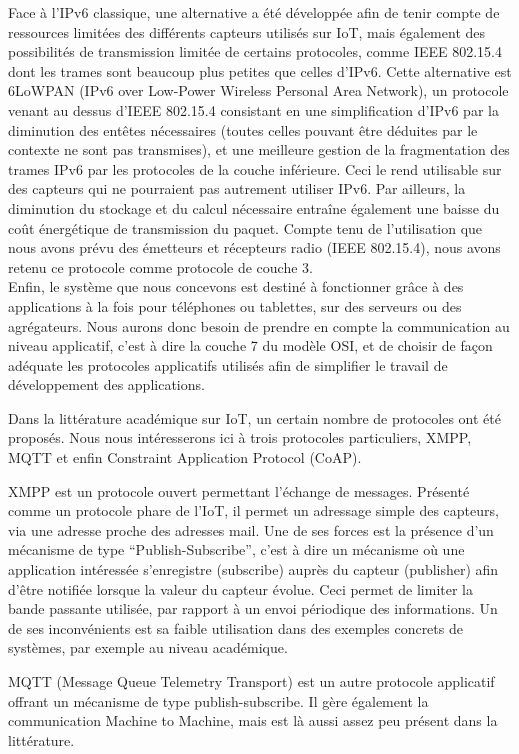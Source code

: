 \documentclass{article}
\begin{document}
Face à l’IPv6 classique, une alternative a été développée afin de tenir compte de ressources limitées des différents capteurs utilisés sur IoT, mais également des possibilités de transmission limitée de certains protocoles, comme IEEE 802.15.4 dont les trames sont beaucoup plus petites que celles d’IPv6. Cette alternative est 6LoWPAN (IPv6 over Low-Power Wireless Personal Area Network), un protocole venant au dessus d’IEEE 802.15.4 consistant en une simplification d’IPv6 par la diminution des entêtes nécessaires (toutes celles pouvant être déduites par le contexte ne sont pas transmises), et une meilleure gestion de la fragmentation des trames IPv6 par les protocoles de la couche inférieure. Ceci le rend utilisable sur des capteurs qui ne pourraient pas autrement utiliser IPv6. Par ailleurs, la diminution du stockage et du calcul nécessaire entraîne également une baisse du coût énergétique de transmission du paquet. Compte tenu de l’utilisation que nous avons prévu des émetteurs et récepteurs radio (IEEE 802.15.4), nous avons retenu ce protocole comme protocole de couche 3.
\\

Enfin, le système que nous concevons est destiné à fonctionner grâce à des applications à la fois pour téléphones ou tablettes, sur des serveurs ou des agrégateurs. Nous aurons donc besoin de prendre en compte la communication au niveau applicatif, c’est à dire la couche 7 du modèle OSI, et de choisir de façon adéquate les protocoles applicatifs utilisés afin de simplifier le travail de développement des applications.

Dans la littérature académique sur IoT, un certain nombre de protocoles ont été proposés. Nous nous intéresserons ici à trois protocoles particuliers, XMPP, MQTT et enfin Constraint Application Protocol (CoAP).

XMPP est un protocole ouvert permettant l’échange de messages. Présenté comme un protocole phare de l’IoT, il permet un adressage simple des capteurs, via une adresse proche des adresses mail. Une de ses forces est la présence d’un mécanisme de type “Publish-Subscribe”, c’est à dire un mécanisme où une application intéressée s’enregistre (subscribe) auprès du capteur (publisher) afin d’être notifiée lorsque la valeur du capteur évolue. Ceci permet de limiter la bande passante utilisée, par rapport à un envoi périodique des informations. Un de ses inconvénients est sa faible utilisation dans des exemples concrets de systèmes, par exemple au niveau académique.

MQTT (Message Queue Telemetry Transport) est un autre protocole applicatif offrant un mécanisme de type publish-subscribe. Il gère également la communication Machine to Machine, mais est là aussi assez peu présent dans la littérature.
\end{document}
